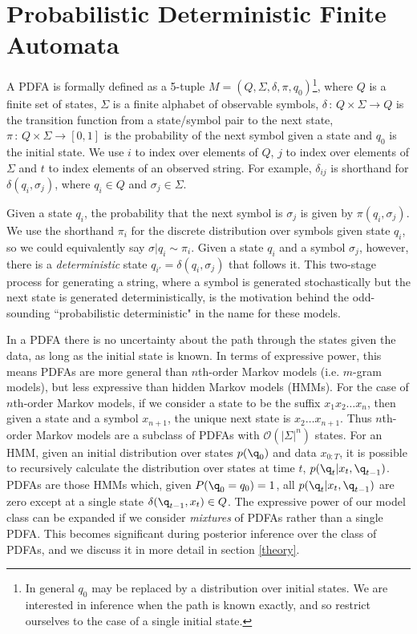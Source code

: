 \section{Probabilistic Deterministic Finite Automata}
A PDFA is formally defined as a 5-tuple $M = (Q,\Sigma,\delta,\pi,q_0)$\footnote{In general $q_0$ may be replaced by a distribution over initial states.  We are interested in inference when the path is known exactly, and so restrict ourselves to the case of a single initial state.}, where $Q$ is a finite set of states, $\Sigma$ is a finite alphabet of observable symbols, $\delta\,:\,Q\times\Sigma\rightarrow Q$ is the transition function from a state/symbol pair to the next state, $\pi\,:\,Q\times\Sigma\rightarrow[0,1]$ is the probability of the next symbol given a state and $q_0$ is the initial state.  We use $i$ to index over elements of $Q$, $j$ to index over elements of $\Sigma$ and $t$ to index elements of an observed string.  For example, $\delta_{ij}$ is shorthand for $\delta(q_i,\sigma_j)$, where $q_i \in Q$ and $\sigma_j \in \Sigma$.

Given a state $q_i$, the probability that the next symbol is $\sigma_j$ is given by $\pi(q_i,\sigma_j)$.  We use the shorthand $\pi_i$ for the discrete distribution over symbols given state $q_i$, so we could equivalently say $\sigma|q_i \sim \pi_i$.  Given a state $q_i$ and a symbol $\sigma_j$, however, there is a {\it deterministic} state $q_{i'} = \delta(q_i,\sigma_j)$ that follows it.  This two-stage process for generating a string, where a symbol is generated stochastically but the next state is generated deterministically, is the motivation behind the odd-sounding ``probabilistic deterministic" in the name for these models.  

In a PDFA there is no uncertainty about the path through the states given the data, as long as the initial state is known.  In terms of expressive power, this means PDFAs are more general than $n$th-order Markov models (i.e. $m$-gram models), but less expressive than hidden Markov models (HMMs).  For the case of $n$th-order Markov models, if we consider a state to be the suffix $x_1 x_2 \ldots x_n$, then given a state and a symbol $x_{n+1}$, the unique next state is $x_2 \ldots x_{n+1}$.  Thus $n$th-order Markov models are a subclass of PDFAs with $\mathcal{O}(|\Sigma|^n)$ states.  For an HMM, given an initial distribution over states $p(\q_0)$ and data $x_{0:T}$, it is possible to recursively calculate the distribution over states at time $t$, $p(\q_t|x_t,\q_{t-1})$.  PDFAs are those HMMs which, given $P(\q_0 = q_0) = 1$, all $p(\q_t|x_t,\q_{t-1})$ are zero except at a single state $\delta(\q_{t-1},x_t) \in Q$.  The expressive power of our model class can be expanded if we consider {\em mixtures} of PDFAs rather than a single PDFA.  This becomes significant during posterior inference over the class of PDFAs, and we discuss it in more detail in section \ref{theory}.